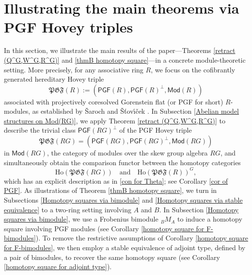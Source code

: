 \documentclass[12pt,twoside]{amsart}
\theoremstyle{bfupright head,slanted body}
\theoremstyle{bfupright head,upright body}
\theoremstyle{fixed bf head,slanted body}
\theoremstyle{fixed bf head,upright body}
\theoremstyle{numbered paragraph}
\numberwithin{equation}{res}
\newcommand{\PGF}{\mathsf{PGF}}
\newcommand{\Mod}{\mathsf{Mod}}
\newcommand{\Ho}{\mathrm{Ho}}
\begin{document}
\section{Illustrating the main theorems via PGF Hovey triples}
\label{Abelian model structures on Mod(RG) int}%
\noindent
In this section, we illustrate the main results of the paper---Theorems \ref{retract (Q^G,W^G,R^G)} and \ref{thmB homotopy square}---in a concrete module-theoretic setting. More precisely, for any associative ring \(R\), we focus on the cofibrantly generated hereditary Hovey triple
\[
\mathfrak{PGF}(R):=(\PGF(R),\PGF(R)^\bot,\Mod(R))
\]
associated with projectively coresolved Gorenstein flat (or PGF for short) \(R\)-modules, as established by \v{S}aroch and \v{S}\v{t}ov\'{\i}\v{c}ek \cite{2020Sto}.
In Subsection \ref{Abelian model structures on Mod(RG)}, we apply Theorem \ref{retract (Q^G,W^G,R^G)} to describe the trivial class \(\PGF(RG)^\bot\) of the PGF Hovey triple
\[
\mathfrak{PGF}(RG)=(\PGF(RG),\PGF(RG)^\bot,\Mod(RG))
\]
in \(\Mod(RG)\), the category of modules over the skew group algebra \(RG\), and simultaneously obtain the comparison functor between the homotopy categories
\[
\Ho(\mathfrak{PGF}(RG)) \quad\text{and}\quad \Ho(\mathfrak{PGF}(R))^G,
\]
which has an explicit description as in \ref{con for Theta}; see Corollary \ref{cor of PGF}.
As illustrations of Theorem \ref{thmB homotopy square}, we turn in Subsections \ref{Homotopy squares via bimodule} and \ref{Homotopy squares via stable equivalence} to a two-ring setting involving \(A\) and \(B\).
In Subsection \ref{Homotopy squares via bimodule}, we use a Frobenius bimodule \({}_BM_A\) to induce a homotopy square involving PGF modules (see Corollary \ref{homotopy square for F-bimodules}).
To remove the restrictive assumptions of Corollary \ref{homotopy square for F-bimodules}, we then employ a stable equivalence of adjoint type, defined by a pair of bimodules, to recover the same homotopy square (see Corollary \ref{homotopy square for adjoint type}).
\end{document}
